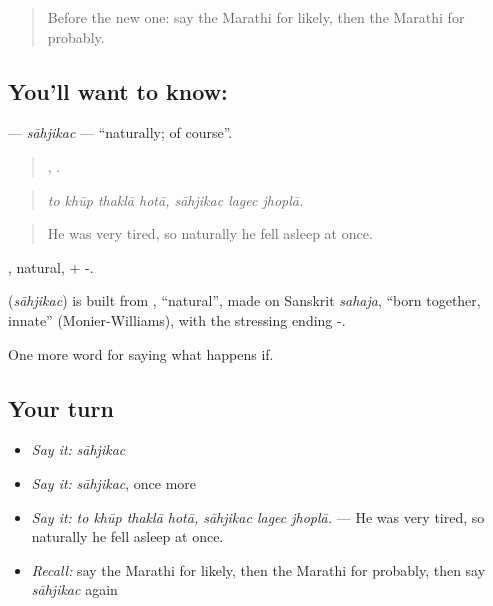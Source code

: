 \label{lesson:MR-C382-sahjikac}



\begin{quote}
Before the new one: say the Marathi for likely, then the Marathi for probably.
\end{quote}

\subsection*{You'll want to know: }
\textbf{} — \emph{sāhjikac} — \textquotedblleft{}naturally; of course\textquotedblright{}.

\begin{quote}
   ,   .
\end{quote}

\begin{quote}
\emph{to khūp thaklā hotā, sāhjikac lagec jhoplā.}
\end{quote}

\begin{quote}
He was very tired, so naturally he fell asleep at once.
\end{quote}

, natural, + -.

\begin{cousinweb}
\textbf{} (\emph{sāhjikac}) is built from , \textquotedblleft{}natural\textquotedblright{}, made on Sanskrit \emph{sahaja}, \textquotedblleft{}born together, innate\textquotedblright{} (Monier-Williams), with the stressing ending -.
\end{cousinweb}

\begin{grammarlens}[title={What you've built}]
One more word for saying what happens if.
\end{grammarlens}

\subsection*{Your turn}
\begin{itemize}
\raggedright
  \item \emph{Say it:} \emph{sāhjikac}
  \item \emph{Say it:} \emph{sāhjikac}, once more
  \item \emph{Say it:} \emph{to khūp thaklā hotā, sāhjikac lagec jhoplā.} — He was very tired, so naturally he fell asleep at once.
  \item \emph{Recall:} say the Marathi for likely, then the Marathi for probably, then say \emph{sāhjikac} again
\end{itemize}

